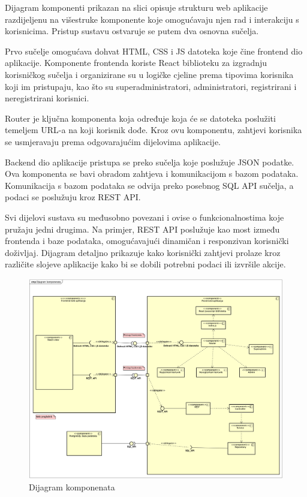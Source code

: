 			 Dijagram komponenti prikazan na slici opisuje strukturu web aplikacije razdijeljenu na višestruke komponente koje omogućavaju njen rad i interakciju s korisnicima. Pristup sustavu ostvaruje se putem dva osnovna sučelja.
			 
			 Prvo sučelje omogućava dohvat HTML, CSS i JS datoteka koje čine frontend dio aplikacije. Komponente frontenda koriste React biblioteku za izgradnju korisničkog sučelja i organizirane su u logičke cjeline prema tipovima korisnika koji im pristupaju, kao što su superadministratori, administratori, registrirani i neregistrirani korisnici.
			 
			 Router je ključna komponenta koja određuje koja će se datoteka poslužiti temeljem URL-a na koji korisnik dođe. Kroz ovu komponentu, zahtjevi korisnika se usmjeravaju prema odgovarajućim dijelovima aplikacije.
			 
			 Backend dio aplikacije pristupa se preko sučelja koje poslužuje JSON podatke. Ova komponenta se bavi obradom zahtjeva i komunikacijom s bazom podataka. Komunikacija s bazom podataka se odvija preko posebnog SQL API sučelja, a podaci se poslužuju kroz REST API.
			 
			 Svi dijelovi sustava su međusobno povezani i ovise o funkcionalnostima koje pružaju jedni drugima. Na primjer, REST API poslužuje kao most između frontenda i baze podataka, omogućavajući dinamičan i responzivan korisnički doživljaj. Dijagram detaljno prikazuje kako korisnički zahtjevi prolaze kroz različite slojeve aplikacije kako bi se dobili potrebni podaci ili izvršile akcije.
			 
			 \begin{figure}[H]
			 	\includegraphics[scale=0.45]{dijagrami/dijagram_komponenata.png}%
			 	\centering
			 	\caption{Dijagram komponenata}
			 	\label{fig:promjene}
			 \end{figure}
		